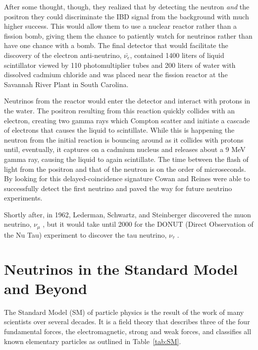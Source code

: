 After some thought, though, they realized that by detecting the neutron \textit{and} the positron they could discriminate the IBD signal from the background with much higher success. This would allow them to use a nuclear reactor rather than a fission bomb, giving them the chance to patiently watch for neutrinos rather than have one chance with a bomb. 
The final detector that would facilitate the discovery of the electron anti-neutrino, $\bar{\nu_{e}}$, contained 1400 liters of liquid scintillator viewed by 110 photomultiplier tubes and 200 liters of water with dissolved cadmium chloride and was placed near the fission reactor at the Savannah River Plant in South Carolina. 

Neutrinos from the reactor would enter the detector and interact with protons in the water. The positron resulting from this reaction quickly collides with an electron, creating two gamma rays which Compton scatter and initiate a cascade of electrons that causes the liquid to scintillate. 
While this is happening the neutron from the initial reaction is bouncing around as it collides with protons until, eventually, it captures on a cadmium nucleus and releases about a 9 MeV gamma ray, causing the liquid to again scintillate. 
The time between the flash of light from the positron and that of the neutron is on the order of microseconds. 
By looking for this delayed-coincidence signature Cowan and Reines were able to successfully detect the first neutrino and paved the way for future neutrino experiments. 

Shortly after, in 1962, Lederman, Schwartz, and Steinberger discovered the muon neutrino, $\nu_{\mu}$ \cite{Lederman}, but it would take until 2000 for the DONUT (Direct Observation of the Nu Tau) experiment to discover the tau neutrino, $\nu_{\tau}$ \cite{TauDONUT,DONUT}.


\section{Neutrinos in the Standard Model and Beyond} \label{ch:NeutrinosInSM}

The Standard Model (SM) of particle physics is the result of the work of many scientists over several decades. It is a field theory that describes three of the four fundamental forces, the electromagnetic, strong and weak forces, and classifies all known elementary particles as outlined in Table~\ref{tab:SM}.


